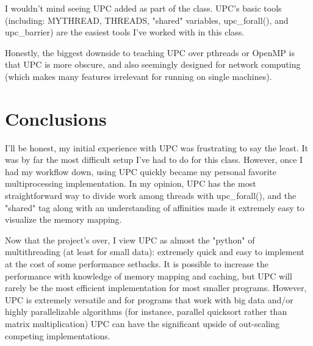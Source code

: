 \documentclass{article}
\begin{document}
I wouldn't mind seeing UPC added as part of the class. UPC's basic tools (including: MYTHREAD, THREADS, "shared" variables, upc\_forall(), and upc\_barrier) are the easiest tools I've worked with in this class. 

Honestly, the biggest downside to teaching UPC over pthreads or OpenMP is that UPC is more obscure, and also seemingly designed for network computing (which makes many features irrelevant for running on single machines).

\section{Conclusions}

I'll be honest, my initial experience with UPC was frustrating to say the least. It was by far the most difficult setup I've had to do for this class. However, once I had my workflow down, using UPC quickly became my personal favorite multiprocessing implementation. In my opinion, UPC has the most straightforward way to divide work among threads with upc\_forall(), and the "shared" tag along with an understanding of affinities made it extremely easy to visualize the memory mapping.

Now that the project's over, I view UPC as almost the "python" of multithreading (at least for small data): extremely quick and easy to implement at the cost of some performance setbacks. It is possible to increase the performance with knowledge of memory mapping and caching, but UPC will rarely be the most efficient implementation for most smaller programs. However, UPC is extremely versatile and for programs that work with big data and/or highly parallelizable algorithms (for instance, parallel quicksort rather than matrix multiplication) UPC can have the significant upside of out-scaling competing implementations.
\end{document}
